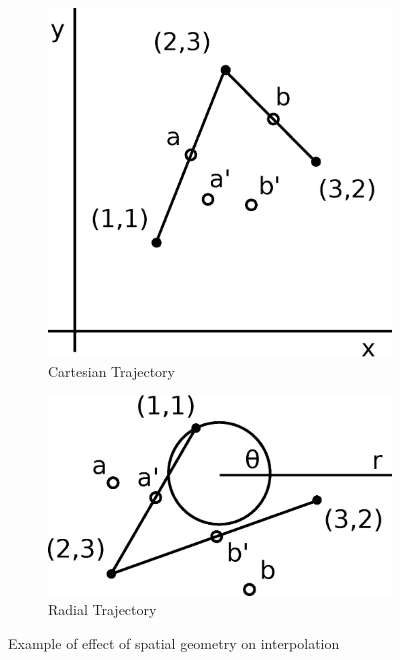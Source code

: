 \begin{figure}
  \centering
  \begin{subfigure}[H]{0.45\linewidth}
    \def\svgwidth{\linewidth}
    \includegraphics[width=\linewidth]{fig/interpolation-cartesian.eps}
    \caption{Cartesian Trajectory}
  \end{subfigure}
  \begin{subfigure}[H]{0.45\linewidth}
    \def\svgwidth{\linewidth}
    \includegraphics[width=\linewidth]{fig/interpolation-radial.eps}
    \caption{Radial Trajectory}
  \end{subfigure}
  \caption{Example of effect of spatial geometry on interpolation}
\end{figure}

